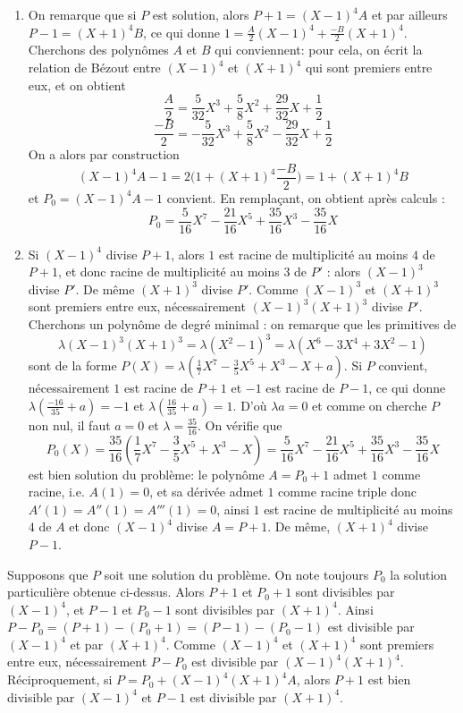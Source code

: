 \documentclass[11pt,a4paper]{article}
\begin{document}
\begin{enumerate}
\item On remarque que si $P$ est solution, alors $P+1=(X-1)^4A$ et par ailleurs $P-1=(X+1)^4B$, ce qui donne $1=\frac{A}{2}(X-1)^4+\frac{-B}{2}(X+1)^4$. Cherchons des polynômes $A$ et $B$ qui conviennent: pour cela, on écrit la relation de Bézout entre $(X-1)^4$ et $(X+1)^4$ qui sont premiers entre eux, et on obtient 
$$\frac{A}{2}=\frac{5}{32}X^3+\frac{5}{8}X^2+\frac{29}{32}X+\frac{1}{2}$$
$$\frac{-B}{2}=-\frac{5}{32}X^3+\frac{5}{8}X^2-\frac{29}{32}X+\frac{1}{2}$$
On a alors par construction
$$(X-1)^4A-1=2\bigg(1+(X+1)^4\frac{-B}{2}\bigg)=1+(X+1)^4B$$
et $P_0=(X-1)^4A-1$ convient. En remplaçant, on obtient après calculs :
$$P_0 = \frac{5}{16}X^7-\frac{21}{16}X^5+\frac{35}{16}X^3-\frac{35}{16}X$$


\item Si $(X-1)^4$ divise $P+1$, alors $1$ est racine de multiplicité au moins $4$
de $P+1$, et donc racine de multiplicité au moins $3$ de $P'$ : 
alors $(X-1)^3$ divise $P'$. De même $(X+1)^3$ divise $P'$. 
Comme  $(X-1)^3$ et  $(X+1)^3$ sont premiers entre eux, nécessairement $(X-1)^3(X+1)^3$ divise $P'$. 
Cherchons un polynôme de degré minimal : on remarque que les primitives de 
$$\lambda(X-1)^3(X+1)^3=\lambda(X^2-1)^3=\lambda(X^6-3X^4+3X^2-1)$$
sont de la forme $P(X)=\lambda(\frac{1}{7}X^7-\frac{3}{5}X^5+X^3-X+a)$. 
Si $P$ convient, nécessairement $1$ est racine de $P+1$ et $-1$ est racine de $P-1$, ce qui donne
$\lambda(\frac{-16}{35}+a)=-1$ et $\lambda(\frac{16}{35}+a)=1$. 
D'où $\lambda a=0$ et comme on cherche $P$ non nul, il faut $a=0$ et $\lambda=\frac{35}{16}$. 
On vérifie que 
$$P_0(X)=\frac{35}{16}(\frac{1}{7}X^7-\frac{3}{5}X^5+X^3-X)=\frac{5}{16}X^7-\frac{21}{16}X^5
+\frac{35}{16}X^3-\frac{35}{16}X$$
 est bien solution du problème: le polynôme $A=P_0+1$ admet $1$ comme racine, i.e. $A(1)=0$, 
 et sa dérivée admet $1$ comme racine triple donc $A'(1)=A''(1)=A'''(1)=0$, 
 ainsi $1$ est racine de multiplicité au moins $4$ de $A$ et donc $(X-1)^4$ divise $A=P+1$. 
 De même, $(X+1)^4$ divise $P-1$.
\end{enumerate}


Supposons que $P$ soit une solution du problème. On note toujours $P_0$ la solution particulière obtenue ci-dessus.
Alors $P+1$ et $P_0+1$ sont divisibles par $(X-1)^4$, et $P-1$ et $P_0-1$ sont divisibles par $(X+1)^4$. 
Ainsi $P-P_0=(P+1)-(P_0+1)=(P-1)-(P_0-1)$ est divisible par $(X-1)^4$ et par $(X+1)^4$. 
Comme $(X-1)^4$ et $(X+1)^4$ sont premiers entre eux, nécessairement $P-P_0$ est divisible 
par $(X-1)^4(X+1)^4$. Réciproquement, si $P=P_0+(X-1)^4(X+1)^4A$, alors $P+1$ est 
bien divisible par $(X-1)^4$ et $P-1$ est divisible par $(X+1)^4$. 
\end{document}
